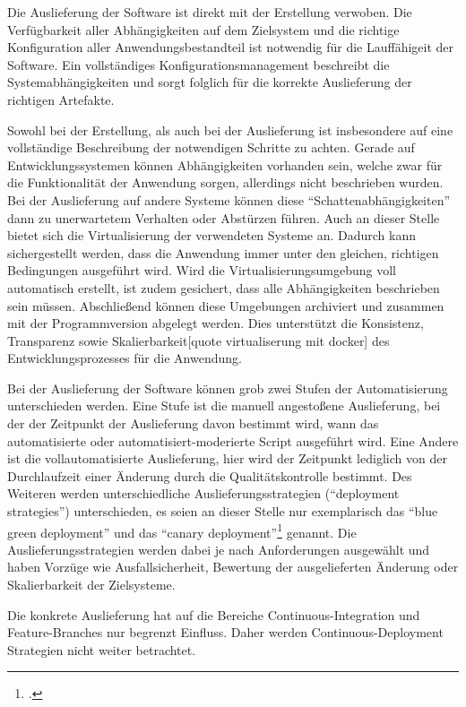 Die Auslieferung der Software ist direkt mit der Erstellung verwoben. Die Verfügbarkeit aller Abhängigkeiten auf dem 
Zielsystem und die richtige Konfiguration aller Anwendungsbestandteil ist notwendig für die Lauffähigeit der Software. 
Ein vollständiges Konfigurationsmanagement beschreibt die Systemabhängigkeiten und sorgt folglich für die korrekte 
Auslieferung der richtigen Artefakte.

Sowohl bei der Erstellung, als auch bei der Auslieferung ist insbesondere auf eine vollständige Beschreibung der 
notwendigen Schritte zu achten. Gerade auf Entwicklungssystemen können Abhängigkeiten vorhanden sein, welche zwar für die 
Funktionalität der Anwendung sorgen, allerdings nicht beschrieben wurden. Bei der Auslieferung auf andere Systeme können 
diese ``Schattenabhängigkeiten'' dann zu unerwartetem Verhalten oder Abstürzen führen. 
Auch an dieser Stelle bietet sich die Virtualisierung der verwendeten Systeme an. Dadurch kann sichergestellt werden, 
dass die Anwendung immer unter den gleichen, richtigen Bedingungen ausgeführt wird. Wird die Virtualisierungsumgebung 
voll automatisch erstellt, ist zudem gesichert, dass alle Abhängigkeiten beschrieben sein müssen.
Abschließend können diese Umgebungen archiviert und zusammen mit der Programmversion abgelegt werden. Dies unterstützt 
die Konsistenz, Transparenz sowie Skalierbarkeit[quote virtualiserung mit docker] des Entwicklungsprozesses für die 
Anwendung.

Bei der Auslieferung der Software können grob zwei Stufen der Automatisierung unterschieden werden. Eine Stufe ist die 
manuell angestoßene Auslieferung, bei der der Zeitpunkt der Auslieferung davon bestimmt wird, wann das automatisierte 
oder automatisiert-moderierte Script ausgeführt wird. Eine Andere ist die vollautomatisierte Auslieferung, hier wird der 
Zeitpunkt lediglich von der Durchlaufzeit einer Änderung durch die Qualitätskontrolle bestimmt.
Des Weiteren werden unterschiedliche Auslieferungsstrategien (``deployment strategies'') unterschieden, es seien an 
dieser Stelle nur exemplarisch das ``blue green deployment'' und das ``canary deployment''\footcite[261-264 Deploying and Releasing Applications][]
{humble2010} genannt. Die Auslieferungsstrategien werden dabei je nach Anforderungen ausgewählt und haben Vorzüge wie 
Ausfallsicherheit, Bewertung der ausgelieferten Änderung oder Skalierbarkeit der Zielsysteme.

Die konkrete Auslieferung hat auf die Bereiche Continuous-Integration und Feature-Branches nur begrenzt Einfluss. Daher 
werden Continuous-Deployment Strategien nicht weiter betrachtet.

